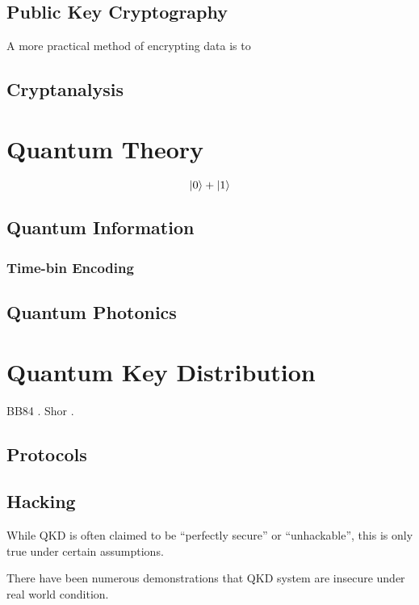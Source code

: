 \subsection{Public Key Cryptography}

A more practical method of encrypting data is to 

\subsection{Cryptanalysis}

\section{Quantum Theory}

\begin{equation}
	\ket{0} + \ket{1}
\end{equation}

\subsection{Quantum Information}

\subsubsection{Time-bin Encoding}

\subsection{Quantum Photonics}

\section{Quantum Key Distribution}

BB84 \cite{BB84}. Shor \cite{shor1994}.

\subsection{Protocols}

\subsection{Hacking}

While \ac{QKD} is often claimed to be ``perfectly secure'' or ``unhackable'', this is only true under certain assumptions. 

There have been numerous demonstrations that \ac{QKD} system are insecure under real world condition.

